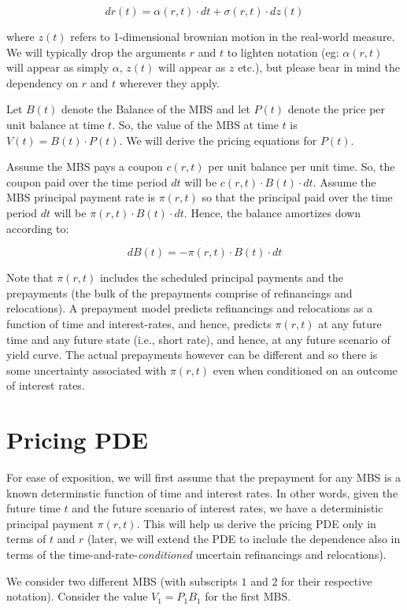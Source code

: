 \documentclass[
11pt, %
a4paper, %
oneside, %
headinclude,footinclude, %
BCOR5mm, %
]{scrartcl}
\begin{document}
$$ dr(t) = \alpha(r, t) \cdot dt + \sigma(r, t) \cdot dz(t)$$

where $z(t)$ refers to 1-dimensional brownian motion in the real-world measure. We will typically drop the arguments $r$ and $t$ to lighten notation (eg: $\alpha(r,t)$ will appear as simply $\alpha$, $z(t)$ will appear as $z$ etc.), but please bear in mind the dependency on $r$ and $t$ wherever they apply.

Let $B(t)$ denote the Balance of the MBS and let $P(t)$ denote the price per unit balance at time $t$. So, the value of the MBS at time $t$ is $V(t) = B(t) \cdot P(t)$. We will derive the pricing equations for $P(t)$. 

Assume the MBS pays a coupon $c(r, t)$ per unit balance per unit time. So, the coupon paid over the time period $dt$ will be $c(r,t) \cdot B(t) \cdot dt$. Assume the MBS principal payment rate is $\pi(r,t)$ so that the principal paid over the time period $dt$ will be $\pi(r,t) \cdot B(t) \cdot dt$. Hence, the balance amortizes down according to:

$$dB(t) = - \pi(r,t) \cdot B(t) \cdot dt$$

Note that $\pi(r,t)$ includes the scheduled principal payments and the prepayments (the bulk of the prepayments comprise of refinancings and relocations). A prepayment model predicts refinancings and relocations as a function of time and interest-rates, and hence, predicts $\pi(r,t)$ at any future time and any future state (i.e., short rate), and hence, at any future scenario of yield curve. The actual prepayments however can be different and so there is some uncertainty associated with $\pi(r,t)$ even when conditioned on an outcome of interest rates.

\section{Pricing PDE}

For ease of exposition, we will first assume that the prepayment for any MBS is a known determinstic function of time and interest rates. In other words, given the future time $t$ and the future scenario of interest rates, we have a deterministic principal payment $\pi(r,t)$. This will help us derive the pricing PDE only in terms of $t$ and $r$ (later, we will extend the PDE to include the dependence also in terms of the time-and-rate-{\em conditioned} uncertain refinancings and relocations).

We consider two different MBS (with subscripts $1$ and $2$ for their respective notation). Consider the value $V_1 = P_1 B_1$ for the first MBS.
\end{document}
